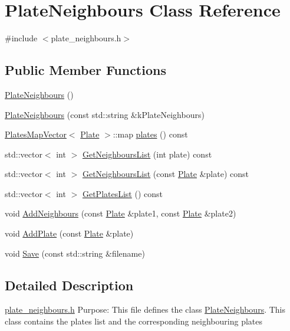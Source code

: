 \hypertarget{class_plate_neighbours}{\section{Plate\-Neighbours Class Reference}
\label{class_plate_neighbours}
}


{\ttfamily \#include $<$plate\-\_\-neighbours.\-h$>$}

\subsection*{Public Member Functions}
\begin{DoxyCompactItemize}
\item 
\hyperlink{class_plate_neighbours_a004ec26ae1addb3670495eb3d0c3fbd3}{Plate\-Neighbours} ()
\item 
\hyperlink{class_plate_neighbours_a8b4e4e50596436525e2ac49cb9c85e99}{Plate\-Neighbours} (const std\-::string \&k\-Plate\-Neighbours)
\item 
\hyperlink{struct_plates_map_vector}{Plates\-Map\-Vector}$<$ \hyperlink{class_plate}{Plate} $>$\-::map \hyperlink{class_plate_neighbours_ac6fa1d2d5e0568f4b4ee2cd7713a4c40}{plates} () const 
\item 
std\-::vector$<$ int $>$ \hyperlink{class_plate_neighbours_a4f82e69c6f250f74a0f965a59f2ed5a9}{Get\-Neighbours\-List} (int plate) const 
\item 
std\-::vector$<$ int $>$ \hyperlink{class_plate_neighbours_a2b04f29a3dd27fe9d0e7889dc41c53a9}{Get\-Neighbours\-List} (const \hyperlink{class_plate}{Plate} \&plate) const 
\item 
std\-::vector$<$ int $>$ \hyperlink{class_plate_neighbours_ab05099a51c50c60b2af9f60b1494e024}{Get\-Plates\-List} () const 
\item 
void \hyperlink{class_plate_neighbours_a8a2ec1853956c5db0e64cb4141b3105a}{Add\-Neighbours} (const \hyperlink{class_plate}{Plate} \&plate1, const \hyperlink{class_plate}{Plate} \&plate2)
\item 
void \hyperlink{class_plate_neighbours_acc3782d4bf8244397ab498c70981f06b}{Add\-Plate} (const \hyperlink{class_plate}{Plate} \&plate)
\item 
void \hyperlink{class_plate_neighbours_a48ff11a6c830d0a153179c41a4c5a7f9}{Save} (const std\-::string \&filename)
\end{DoxyCompactItemize}


\subsection{Detailed Description}
\hyperlink{plate__neighbours_8h}{plate\-\_\-neighbours.\-h} Purpose\-: This file defines the class \hyperlink{class_plate_neighbours}{Plate\-Neighbours}. This class contains the plates list and the corresponding neighbouring plates

